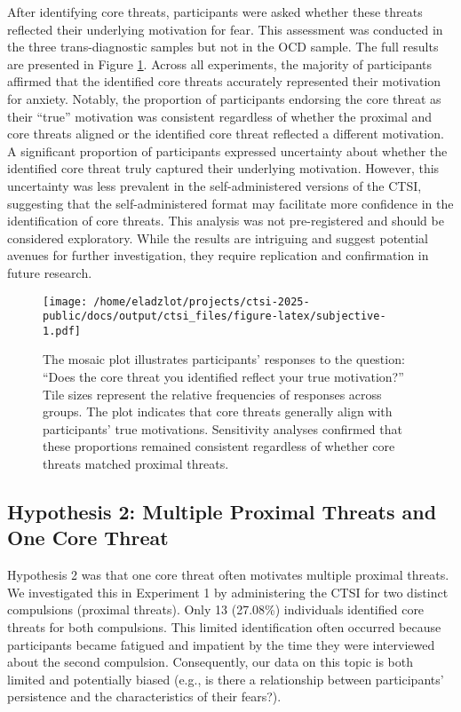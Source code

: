 \documentclass[
  man,floatsintext]{apa7}
\begin{document}
After identifying core threats, participants were asked whether these threats reflected their underlying motivation for fear.
This assessment was conducted in the three trans-diagnostic samples but not in the OCD sample.
The full results are presented in Figure \ref{fig:subjective}.
Across all experiments, the majority of participants affirmed that the identified core threats accurately represented their motivation for anxiety.
Notably, the proportion of participants endorsing the core threat as their ``true'' motivation was consistent regardless of whether the proximal and core threats aligned or the identified core threat reflected a different motivation.
A significant proportion of participants expressed uncertainty about whether the identified core threat truly captured their underlying motivation.
However, this uncertainty was less prevalent in the self-administered versions of the CTSI, suggesting that the self-administered format may facilitate more confidence in the identification of core threats.
This analysis was not pre-registered and should be considered exploratory.
While the results are intriguing and suggest potential avenues for further investigation, they require replication and confirmation in future research.



\begin{figure}
\centering
\texttt{[image: /home/eladzlot/projects/ctsi-2025-public/docs/output/ctsi\_files/figure-latex/subjective-1.pdf]}
\caption{\label{fig:subjective}The mosaic plot illustrates participants' responses to the question: ``Does the core threat you identified reflect your true motivation?'' Tile sizes represent the relative frequencies of responses across groups. The plot indicates that core threats generally align with participants' true motivations. Sensitivity analyses confirmed that these proportions remained consistent regardless of whether core threats matched proximal threats.}
\end{figure}

\subsection{Hypothesis 2: Multiple Proximal Threats and One Core Threat}\label{hypothesis-2-multiple-proximal-threats-and-one-core-threat}

Hypothesis 2 was that one core threat often motivates multiple proximal threats.
We investigated this in Experiment 1 by administering the CTSI for two distinct compulsions (proximal threats).
Only 13 (27.08\%) individuals identified core threats for both compulsions.
This limited identification often occurred because participants became fatigued and impatient by the time they were interviewed about the second compulsion.
Consequently, our data on this topic is both limited and potentially biased (e.g., is there a relationship between participants' persistence and the characteristics of their fears?).
\end{document}

